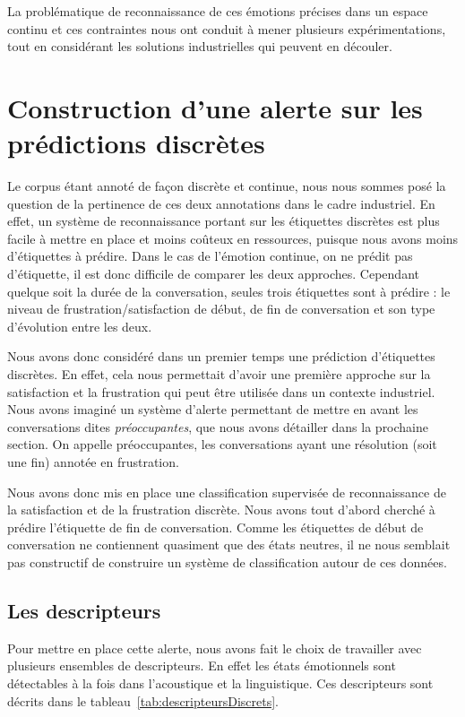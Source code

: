 La problématique de reconnaissance de ces émotions précises dans un espace continu et ces contraintes nous ont conduit à mener plusieurs expérimentations, tout en considérant les solutions industrielles qui peuvent en découler.

\section{Construction d'une alerte sur les prédictions discrètes}
Le corpus étant annoté de façon discrète et continue, nous nous sommes posé la question de la pertinence de ces deux annotations dans le cadre industriel. En effet, un système de reconnaissance portant sur les étiquettes discrètes est plus facile à mettre en place et moins coûteux en ressources, puisque nous avons moins d'étiquettes à prédire. Dans le cas de l'émotion continue, on ne prédit pas d'étiquette, il est donc difficile de comparer les deux approches. Cependant quelque soit la durée de la conversation, seules trois étiquettes sont à prédire : le niveau de frustration/satisfaction de début, de fin de conversation et son type d'évolution entre les deux.

Nous avons donc considéré dans un premier temps une prédiction d'étiquettes discrètes. En effet, cela nous permettait d'avoir une première approche sur la satisfaction et la frustration qui peut être utilisée dans un contexte industriel. Nous avons imaginé un système d'alerte permettant de mettre en avant les conversations dites \emph{préoccupantes}, que nous avons détailler dans la prochaine section. On appelle préoccupantes, les conversations ayant une résolution (soit une fin) annotée en frustration.

Nous avons donc mis en place une classification supervisée de reconnaissance de la satisfaction et de la frustration discrète. Nous avons tout d'abord cherché à prédire l'étiquette de fin de conversation. Comme les étiquettes de début de conversation ne contiennent quasiment que des états neutres, il ne nous semblait pas constructif de construire un système de classification autour de ces données.

\subsection{Les descripteurs}
Pour mettre en place cette alerte, nous avons fait le choix de travailler avec plusieurs ensembles de descripteurs. En effet les états émotionnels sont détectables à la fois dans l'acoustique et la linguistique. Ces descripteurs sont décrits dans le tableau~\ref{tab:descripteursDiscrets}.

